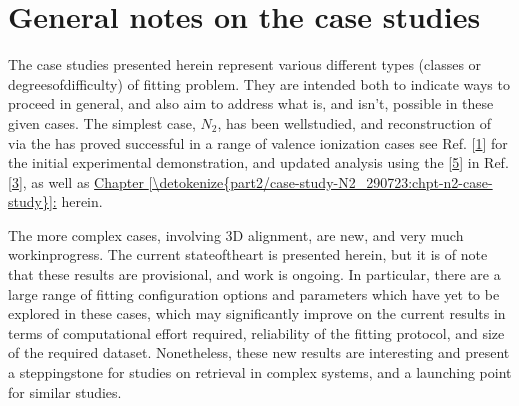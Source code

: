 \documentclass[letterpaper,table,10pt,english]{jupyterBook}
\begin{document}
\section{General notes on the case studies}
\label{\detokenize{part2/extracting_matrix_elements_overview_270423:general-notes-on-the-case-studies}}
\sphinxAtStartPar
The case studies presented herein represent various different types (classes or degrees\sphinxhyphen{}of\sphinxhyphen{}difficulty) of fitting problem. They are intended both to indicate ways to proceed in general, and also aim to address what is, and isn’t, possible in these given cases. The simplest case, \(N_2\), has been well\sphinxhyphen{}studied, and reconstruction of {\hyperref[\detokenize{backmatter/glossary:term-radial-matrix-elements}]{}} via the {\hyperref[\detokenize{backmatter/glossary:term-bootstrap-retrieval-protocol}]{}} has proved successful in a range of valence ionization cases \sphinxhyphen{} see Ref. {[}\hyperlink{cite.backmatter/bibliography:id774}{1}{]} for the initial experimental demonstration, and updated analysis using the  {[}\hyperlink{cite.backmatter/bibliography:id680}{5}{]} in Ref. {[}\hyperlink{cite.backmatter/bibliography:id684}{3}{]}, as well as \hyperref[\detokenize{part2/case-study-N2_290723:chpt-n2-case-study}]{Chapter \ref{\detokenize{part2/case-study-N2_290723:chpt-n2-case-study}}:} herein.

\sphinxAtStartPar
The more complex cases, involving 3D alignment, are new, and very much work\sphinxhyphen{}in\sphinxhyphen{}progress. The current state\sphinxhyphen{}of\sphinxhyphen{}the\sphinxhyphen{}art is presented herein, but it is of note that these results are provisional, and work is ongoing. In particular, there are a large range of fitting configuration options and parameters which have yet to be explored in these cases, which may significantly improve on the current results in terms of computational effort required, reliability of the fitting protocol, and size of the required dataset. Nonetheless, these new results are interesting and present a stepping\sphinxhyphen{}stone for studies on {\hyperref[\detokenize{backmatter/glossary:term-radial-matrix-elements}]{}} retrieval in complex systems, and a launching point for similar studies.
\end{document}
